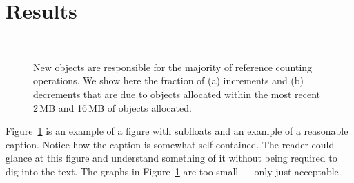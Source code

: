 \section{Results}
\label{sec:results}

\begin{figure}
  \centering
  \\
  \caption{New objects are responsible for the majority of reference
    counting operations.  We show here the fraction of (a) increments
    and (b) decrements that are due to objects allocated within the
    most recent 2\,MB and 16\,MB of objects allocated.}
  \label{fig:incdecnew}
\end{figure}

Figure~\ref{fig:incdecnew} is an example of a figure with subfloats
and an example of a reasonable caption.  Notice how the caption is
somewhat self-contained.  The reader could glance at this figure and
understand something of it without being required to dig into the
text. The graphs in Figure~\ref{fig:incdecnew} are too small --- only
just acceptable.


